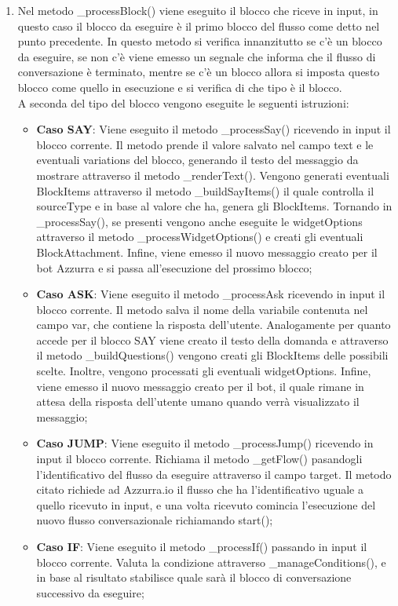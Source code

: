 \begin{enumerate}
	\item Nel metodo \_processBlock() viene eseguito il blocco che riceve in input, in questo caso il blocco da eseguire è il primo blocco del flusso come detto nel punto precedente. In questo metodo si verifica innanzitutto se c'è un blocco da eseguire, se non c'è viene emesso un segnale che informa che il flusso di conversazione è terminato, mentre se c'è un blocco allora si imposta questo blocco come quello in esecuzione e si verifica di che tipo è il blocco.\\
	A seconda del tipo del blocco vengono eseguite le seguenti istruzioni:
	\begin{itemize}
		\item \textbf{Caso SAY}: Viene eseguito il metodo \_processSay() ricevendo in input il blocco corrente. Il metodo prende il valore salvato nel campo text e le eventuali variations del blocco, generando il testo del messaggio da mostrare attraverso il metodo \_renderText(). Vengono generati eventuali BlockItems attraverso il metodo \_buildSayItems() il quale controlla il sourceType e in base al valore che ha, genera gli BlockItems. Tornando in \_processSay(), se presenti vengono anche eseguite le widgetOptions attraverso il metodo \_processWidgetOptions() e creati gli eventuali BlockAttachment. Infine, viene emesso il nuovo messaggio creato per il bot Azzurra e si passa all'esecuzione del prossimo blocco;
		\item \textbf{Caso ASK}: Viene eseguito il metodo \_processAsk ricevendo in input il blocco corrente. Il metodo salva il nome della variabile contenuta nel campo var, che contiene la risposta dell'utente. Analogamente per quanto accede per il blocco SAY viene creato il testo della domanda e attraverso il metodo \_buildQuestions() vengono creati gli BlockItems delle possibili scelte. Inoltre, vengono processati gli eventuali widgetOptions. Infine, viene emesso il nuovo messaggio creato per il bot, il quale rimane in attesa della risposta dell'utente umano quando verrà visualizzato il messaggio;
		\item \textbf{Caso JUMP}: Viene eseguito il metodo \_processJump() ricevendo in input il blocco corrente. Richiama il metodo \_getFlow() pasandogli l'identificativo del flusso da eseguire attraverso il campo target. Il metodo citato richiede ad Azzurra.io il flusso che ha l'identificativo uguale a quello ricevuto in input, e una volta ricevuto comincia l'esecuzione del nuovo flusso conversazionale richiamando start();
		\item \textbf{Caso IF}: Viene eseguito il metodo \_processIf() passando in input il blocco corrente. Valuta la condizione attraverso \_manageConditions(), e in base al risultato stabilisce quale sarà il blocco di conversazione successivo da eseguire;

\end{itemize}
\end{enumerate}
